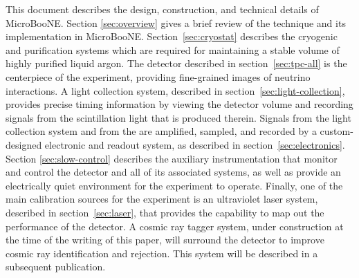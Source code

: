 This document describes the design, construction, and technical details of MicroBooNE.  Section \ref{sec:overview} gives a brief review of the \lartpc technique and its implementation in MicroBooNE.  Section~\ref{sec:cryostat} describes the cryogenic and purification systems which are required for maintaining a stable volume of highly purified liquid argon.  The \lartpc detector described in section~\ref{sec:tpc-all} is the centerpiece of the experiment, providing fine-grained images of neutrino interactions.  A light collection system, described in section~\ref{sec:light-collection}, provides precise timing information by viewing the detector volume and recording signals from the scintillation light that is produced therein. Signals from the light collection system and from the \lartpc are amplified, sampled, and recorded by a custom-designed electronic and readout system, as described in section~\ref{sec:electronics}.  Section \ref{sec:slow-control} describes the auxiliary instrumentation that monitor and control the detector and all of its associated systems, as well as provide an electrically quiet environment for the experiment to operate. Finally, one of the main calibration sources for the experiment is an ultraviolet laser system, described in section~\ref{sec:laser}, that provides the capability to map out the performance of the \lartpc detector.  A cosmic ray tagger system, under construction at the time of the writing of this paper, will surround the detector to improve cosmic ray identification and rejection.  This system will be described in a subsequent publication.  
